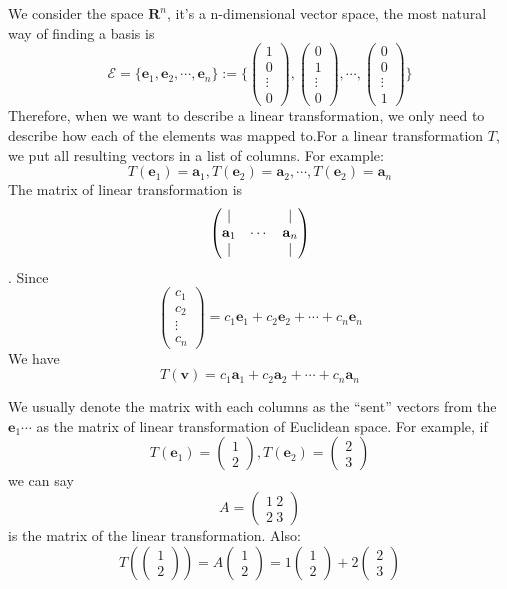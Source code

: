 We consider the space $\mathbf{R}^n$, it's a n-dimensional vector space, the most natural way of finding a basis is $$\mathcal{E} =
\{\mathbf{e}_1,\mathbf{e}_2,\cdots,\mathbf{e}_n\}:=\{
\begin{pmatrix}
    1\\
    0\\
    \vdots\\
    0
\end{pmatrix},\begin{pmatrix}
    0\\
    1\\
    \vdots\\
    0
\end{pmatrix},\cdots, \begin{pmatrix}
    0\\
    0\\
    \vdots\\
    1
\end{pmatrix}
\}$$
Therefore, when we want to describe a linear transformation, we only need to describe how each of the elements was mapped to.For a linear transformation $T$, we put all resulting vectors in a list of columns. For example:
$$T(\mathbf{e}_1) = \mathbf{a}_1,T(\mathbf{e}_2) = \mathbf{a}_2,\cdots,T(\mathbf{e}_2) = \mathbf{a}_n$$
The matrix of linear transformation is 
$$\begin{pmatrix} |& \ & | \\ \mathbf{a}_1& \cdots& \mathbf{a}_n \\ |& \ & | \\ \end{pmatrix}$$.
Since $$\begin{pmatrix}
    c_1\\c_2\\\vdots\\c_n
\end{pmatrix}
 = 
 c_1\mathbf{e}_1+c_2\mathbf{e}_2+\cdots+c_n\mathbf{e}_n$$
We have
$$T(\mathbf{v}) =c_1\mathbf{a}_1+c_2\mathbf{a}_2+\cdots+c_n\mathbf{a}_n $$

We usually denote the matrix with each columns as the ``sent'' vectors from the $\mathbf{e}_1 \cdots$ as the matrix of linear transformation of Euclidean space. For example, if\\
$$T(\mathbf{e}_1) = \begin{pmatrix}
    1\\
    2
\end{pmatrix},T(\mathbf{e}_2) = \begin{pmatrix}
    2\\
    3
\end{pmatrix}$$we can say $$A = \begin{pmatrix}
    1\ 2\\
    2\ 3 
\end{pmatrix}$$
is the matrix of the linear transformation. Also:\\
$$T(\begin{pmatrix}
    1\\2
\end{pmatrix}) = A\begin{pmatrix}
    1\\2
\end{pmatrix} = 1\begin{pmatrix}
    1\\
    2
\end{pmatrix}+2\begin{pmatrix}
    2\\
    3
\end{pmatrix}$$

